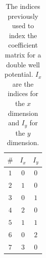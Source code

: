 \documentclass[../main.tex]{subfiles}
\begin{document}
\begin{table}[!ht]
  \centering
  \begin{tabular}{ | c | c | c | }
    \hline
    $\#$ & $I_x$ & $I_y$\\*
    \hline
    $1$ & $0$ & $0$\\*
    \hline
    $2$ & $1$ & $0$\\*
    \hline
    $3$ & $0$ & $1$\\*
    \hline
    $4$ & $2$ & $0$\\*
    \hline
    $5$ & $1$ & $1$\\*
    \hline
    $6$ & $0$ & $2$\\*
    \hline
    $7$ & $3$ & $0$\\*
    \hline
  \end{tabular}
  \caption{The indices previously used to index the coefficient matrix for a double well potential. $I_x$ are the indices for the $x$ dimension and $I_y$ for the $y$ dimension.}
  \label{tab:DoubleWellCoeffIndexWrong}
\end{table}
\end{document}
